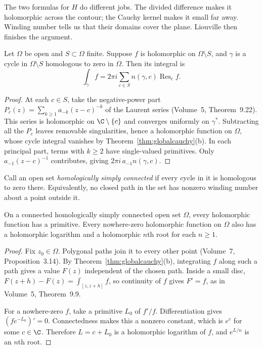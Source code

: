 \begin{beauty}
The two formulas for $H$ do different jobs. The divided difference makes it holomorphic across the contour; the Cauchy kernel makes it small far away. Winding number tells us that their domains cover the plane. Liouville then finishes the argument.
\end{beauty}

\begin{corollary}\label{cor:globalresidue}
Let $\Omega$ be open and $S\subset\Omega$ finite. Suppose $f$ is holomorphic on $\Omega\setminus S$, and $\gamma$ is a cycle in $\Omega\setminus S$ homologous to zero in $\Omega$. Then its integral is
\[\int_\gamma f=2\pi i\sum_{c\in S}n(\gamma,c)\operatorname{Res}_cf.\]
\end{corollary}
\begin{proof}
At each $c\in S$, take the negative-power part $P_c(z)=\sum_{k\ge1}a_{-k}(z-c)^{-k}$ of the Laurent series (Volume~5, Theorem~9.22). This series is holomorphic on $\C\setminus\{c\}$ and converges uniformly on $\gamma^*$. Subtracting all the $P_c$ leaves removable singularities, hence a holomorphic function on $\Omega$, whose cycle integral vanishes by Theorem~\ref{thm:globalcauchy}(b). In each principal part, terms with $k\ge2$ have single-valued primitives. Only $a_{-1}(z-c)^{-1}$ contributes, giving $2\pi i\,a_{-1}n(\gamma,c)$.
\end{proof}

Call an open set \emph{homologically simply connected} if every cycle in it is homologous to zero there. Equivalently, no closed path in the set has nonzero winding number about a point outside it.

\begin{corollary}\label{cor:hsc}
On a connected homologically simply connected open set $\Omega$, every holomorphic function has a primitive. Every nowhere-zero holomorphic function on $\Omega$ also has a holomorphic logarithm and a holomorphic $n$th root for each $n\ge1$.
\end{corollary}
\begin{proof}
Fix $z_0\in\Omega$. Polygonal paths join it to every other point (Volume~7, Proposition~3.14). By Theorem~\ref{thm:globalcauchy}(b), integrating $f$ along such a path gives a value $F(z)$ independent of the chosen path. Inside a small disc, $F(z+h)-F(z)=\int_{[z,z+h]}f$, so continuity of $f$ gives $F'=f$, as in Volume~5, Theorem~9.9.

For a nowhere-zero $f$, take a primitive $L_0$ of $f'/f$. Differentiation gives $(fe^{-L_0})'=0$. Connectedness makes this a nonzero constant, which is $e^c$ for some $c\in\C$. Therefore $L=c+L_0$ is a holomorphic logarithm of $f$, and $e^{L/n}$ is an $n$th root.
\end{proof}

